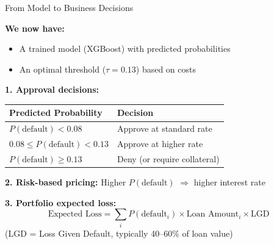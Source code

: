 \documentclass[10pt]{beamer}
\begin{document}
\begin{frame}{From Model to Business Decisions}

  \textbf{We now have:}
  \begin{itemize}
    \item A trained model (XGBoost) with predicted probabilities
    \item An optimal threshold ($\tau = 0.13$) based on costs
  \end{itemize}

  \vspace{0.5em}
  \textbf{1. Approval decisions:}

  \vspace{0.3em}
  \begin{center}
  \begin{tabular}{ll}
    \toprule
    \textbf{Predicted Probability} & \textbf{Decision} \\
    \midrule
    $P(\text{default}) < 0.08$ & Approve at standard rate \\
    $0.08 \leq P(\text{default}) < 0.13$ & Approve at higher rate \\
    $P(\text{default}) \geq 0.13$ & Deny (or require collateral) \\
    \bottomrule
  \end{tabular}
  \end{center}

  \vspace{0.5em}
  \textbf{2. Risk-based pricing:} Higher $P(\text{default})$ $\Rightarrow$ higher interest rate

  \vspace{0.5em}
  \textbf{3. Portfolio expected loss:}
  \[
  \text{Expected Loss} = \sum_{i} P(\text{default}_i) \times \text{Loan Amount}_i \times \text{LGD}
  \]
    {\small (LGD = Loss Given Default, typically 40--60\% of loan value)}
\end{frame}

\end{document}
